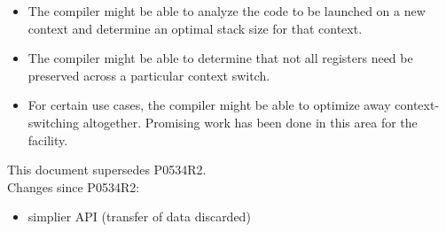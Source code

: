 \documentclass[fontsize=10pt,paper=A4,pagesize,DIV=15]{scrartcl}
\begin{document}
\begin{itemize}
  \item The compiler might be able to analyze the code to be launched on a new
    \cc context and determine an optimal stack size for that context.
  \item The compiler might be able to determine that not all registers need be
    preserved across a particular context switch.
  \item For certain use cases, the compiler might be able to optimize away
    context-switching altogether. Promising work has been done in this area
    for the \coawait facility.\cite{N4649}
\end{itemize}

This document supersedes P0534R2.\cite{P0534R2}\\
\newline
Changes since P0534R2:

\begin{itemize}
    \item simplier API (transfer of data discarded)
\end{itemize}











\end{document}
